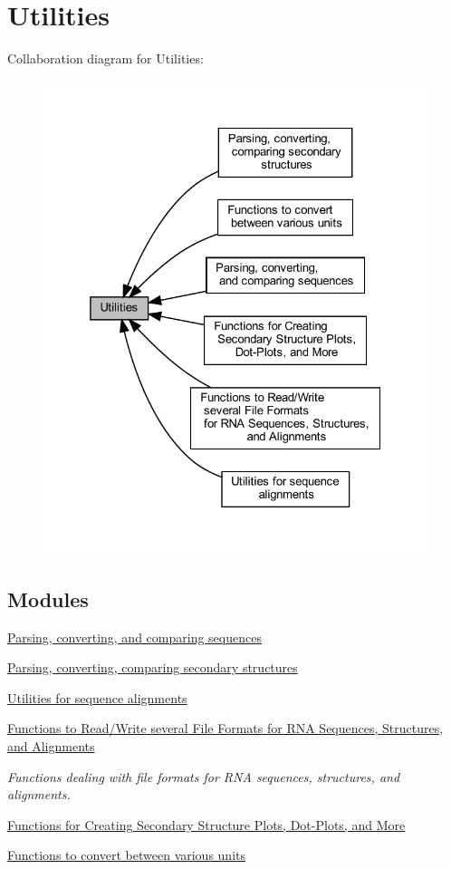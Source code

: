\hypertarget{group__utils}{}\section{Utilities}
\label{group__utils}
Collaboration diagram for Utilities\+:
\nopagebreak
\begin{figure}[H]
\begin{center}
\leavevmode
\includegraphics[width=325pt]{group__utils}
\end{center}
\end{figure}
\subsection*{Modules}
\begin{DoxyCompactItemize}
\item 
\hyperlink{group__string__utils}{Parsing, converting, and comparing sequences}
\item 
\hyperlink{group__struct__utils}{Parsing, converting, comparing secondary structures}
\item 
\hyperlink{group__aln__utils}{Utilities for sequence alignments}
\item 
\hyperlink{group__file__utils}{Functions to Read/\+Write several File Formats for R\+N\+A Sequences, Structures, and Alignments}
\begin{DoxyCompactList}\small\item\em Functions dealing with file formats for R\+NA sequences, structures, and alignments. \end{DoxyCompactList}\item 
\hyperlink{group__plotting__utils}{Functions for Creating Secondary Structure Plots, Dot-\/\+Plots, and More}
\item 
\hyperlink{group__units}{Functions to convert between various units}
\end{DoxyCompactItemize}
